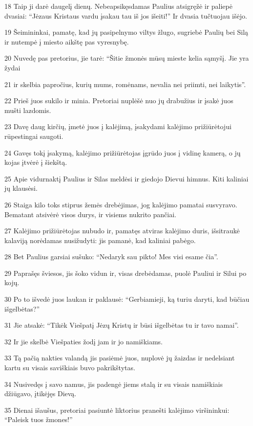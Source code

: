 \par 18 Taip ji darė daugelį dienų. Nebeapsikęsdamas Paulius atsigręžė ir paliepė dvasiai: “Jėzaus Kristaus vardu įsakau tau iš jos išeiti!” Ir dvasia tučtuojau išėjo. 
\par 19 Šeimininkai, pamatę, kad jų pasipelnymo viltys žlugo, sugriebė Paulių bei Silą ir nutempė į miesto aikštę pas vyresnybę. 
\par 20 Nuvedę pas pretorius, jie tarė: “Šitie žmonės mūsų mieste kelia sąmyšį. Jie yra žydai 
\par 21 ir skelbia papročius, kurių mums, romėnams, nevalia nei priimti, nei laikytis”. 
\par 22 Prieš juos sukilo ir minia. Pretoriai nuplėšė nuo jų drabužius ir įsakė juos mušti lazdomis. 
\par 23 Davę daug kirčių, įmetė juos į kalėjimą, įsakydami kalėjimo prižiūrėtojui rūpestingai saugoti. 
\par 24 Gavęs tokį įsakymą, kalėjimo prižiūrėtojas įgrūdo juos į vidinę kamerą, o jų kojas įtvėrė į šiekštą. 
\par 25 Apie vidurnaktį Paulius ir Silas meldėsi ir giedojo Dievui himnus. Kiti kaliniai jų klausėsi. 
\par 26 Staiga kilo toks stiprus žemės drebėjimas, jog kalėjimo pamatai susvyravo. Bematant atsivėrė visos durys, ir visiems nukrito pančiai. 
\par 27 Kalėjimo prižiūrėtojas nubudo ir, pamatęs atviras kalėjimo duris, išsitraukė kalaviją norėdamas nusižudyti: jis pamanė, kad kaliniai pabėgo. 
\par 28 Bet Paulius garsiai sušuko: “Nedaryk sau pikto! Mes visi esame čia”. 
\par 29 Paprašęs šviesos, jis šoko vidun ir, visas drebėdamas, puolė Pauliui ir Silui po kojų. 
\par 30 Po to išvedė juos laukan ir paklausė: “Gerbiamieji, ką turiu daryti, kad būčiau išgelbėtas?” 
\par 31 Jie atsakė: “Tikėk Viešpatį Jėzų Kristų ir būsi išgelbėtas tu ir tavo namai”. 
\par 32 Ir jie skelbė Viešpaties žodį jam ir jo namiškiams. 
\par 33 Tą pačią nakties valandą jis pasiėmė juos, nuplovė jų žaizdas ir nedelsiant kartu su visais saviškiais buvo pakrikštytas. 
\par 34 Nusivedęs į savo namus, jis padengė jiems stalą ir su visais namiškiais džiūgavo, įtikėjęs Dievą. 
\par 35 Dienai išaušus, pretoriai pasiuntė liktorius pranešti kalėjimo viršininkui: “Paleisk tuos žmones!” 
